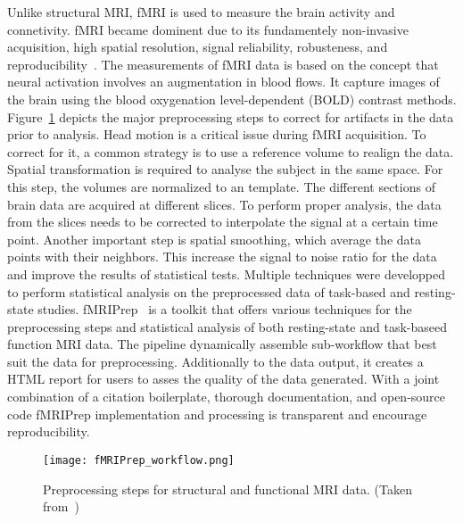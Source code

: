 Unlike structural MRI, fMRI is used to measure the brain activity and connetivity.
fMRI became dominent due to its fundamentely non-invasive acquisition, high spatial
resolution, signal reliability, robusteness, and reproducibility~\cite{Soares2016-tz}.
The measurements of fMRI data is based on the concept that neural activation involves 
an augmentation in blood flows.
It capture images of the brain using the blood oxygenation level-dependent (BOLD) contrast methods.
Figure~\ref{fig:fmri_workflow} depicts the major preprocessing steps to correct 
for artifacts in the data prior to analysis.
Head motion is a critical issue during fMRI acquisition.
To correct for it, a common strategy is to use a reference volume to realign the data.
Spatial transformation is required to analyse the subject in the same space.
For this step, the volumes are normalized to an template.
The different sections of brain data are acquired at different slices.
To perform proper analysis, the data from the slices needs to be corrected to interpolate
the signal at a certain time point.
Another important step is spatial smoothing, which average the data points with their neighbors.
This increase the signal to noise ratio for the data and improve the results of statistical tests.
Multiple techniques were developped to perform statistical analysis on the 
preprocessed data of task-based and resting-state studies.
fMRIPrep~\cite{Esteban2019-og} is a toolkit that offers various techniques for the preprocessing steps 
and statistical analysis of both resting-state and task-baseed function MRI data.
The pipeline dynamically assemble sub-workflow that best suit the data for preprocessing.
Additionally to the data output, it creates a HTML report for users to asses the quality of the data generated.
With a joint combination of a citation boilerplate, thorough documentation, and open-source code
fMRIPrep implementation and processing is transparent and encourage reproducibility.

\begin{figure}[h]
	\centering
	\texttt{[image: fMRIPrep\_workflow.png]}
	\caption{Preprocessing steps for structural and functional MRI data. (Taken from~\cite{Esteban2019-og})}
	\label{fig:fmri_workflow}
\end{figure}

